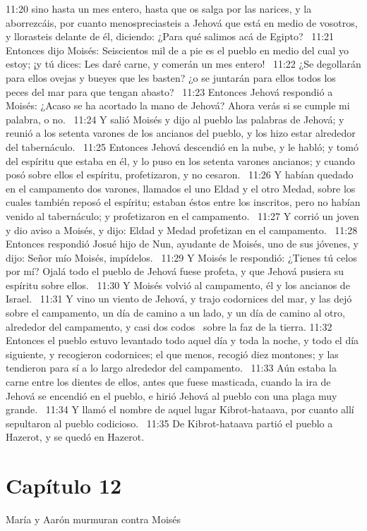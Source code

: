 11:20 sino hasta un mes entero, hasta que os salga por las narices, y la aborrezcáis, por cuanto menospreciasteis a Jehová que está en medio de vosotros, y llorasteis delante de él, diciendo: ¿Para qué salimos acá de Egipto?  
11:21 Entonces dijo Moisés: Seiscientos mil de a pie es el pueblo en medio del cual yo estoy; ¡y tú dices: Les daré carne, y comerán un mes entero!  
11:22 ¿Se degollarán para ellos ovejas y bueyes que les basten? ¿o se juntarán para ellos todos los peces del mar para que tengan abasto?  
11:23 Entonces Jehová respondió a Moisés: ¿Acaso se ha acortado la mano de Jehová? Ahora verás si se cumple mi palabra, o no.  
11:24 Y salió Moisés y dijo al pueblo las palabras de Jehová; y reunió a los setenta varones de los ancianos del pueblo, y los hizo estar alrededor del tabernáculo.  
11:25 Entonces Jehová descendió en la nube, y le habló; y tomó del espíritu que estaba en él, y lo puso en los setenta varones ancianos; y cuando posó sobre ellos el espíritu, profetizaron, y no cesaron.  
11:26 Y habían quedado en el campamento dos varones, llamados el uno Eldad y el otro Medad, sobre los cuales también reposó el espíritu; estaban éstos entre los inscritos, pero no habían venido al tabernáculo; y profetizaron en el campamento.  
11:27 Y corrió un joven y dio aviso a Moisés, y dijo: Eldad y Medad profetizan en el campamento.  
11:28 Entonces respondió Josué hijo de Nun, ayudante de Moisés, uno de sus jóvenes, y dijo: Señor mío Moisés, impídelos.  
11:29 Y Moisés le respondió: ¿Tienes tú celos por mí? Ojalá todo el pueblo de Jehová fuese profeta, y que Jehová pusiera su espíritu sobre ellos.  
11:30 Y Moisés volvió al campamento, él y los ancianos de Israel.  
11:31 Y vino un viento de Jehová, y trajo codornices del mar, y las dejó sobre el campamento, un día de camino a un lado, y un día de camino al otro, alrededor del campamento, y casi dos codos  sobre la faz de la tierra. 
11:32 Entonces el pueblo estuvo levantado todo aquel día y toda la noche, y todo el día siguiente, y recogieron codornices; el que menos, recogió diez montones; y las tendieron para sí a lo largo alrededor del campamento.  
11:33 Aún estaba la carne entre los dientes de ellos, antes que fuese masticada, cuando la ira de Jehová se encendió en el pueblo, e hirió Jehová al pueblo con una plaga muy grande.  
11:34 Y llamó el nombre de aquel lugar Kibrot-hataava, por cuanto allí sepultaron al pueblo codicioso.  
11:35 De Kibrot-hataava partió el pueblo a Hazerot, y se quedó en Hazerot.  
\section*{Capítulo 12}
María y Aarón murmuran contra Moisés  


